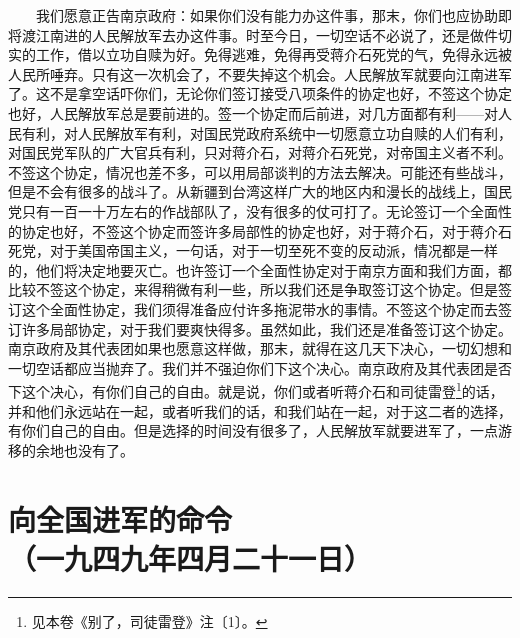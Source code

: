 \documentclass[cn,11pt,chinese]{elegantbook}
\def\myformat#1{\hfil\hfil #1}
\begin{document}
　　我们愿意正告南京政府：如果你们没有能力办这件事，那末，你们也应协助即将渡江南进的人民解放军去办这件事。时至今日，一切空话不必说了，还是做件切实的工作，借以立功自赎为好。免得逃难，免得再受蒋介石死党的气，免得永远被人民所唾弃。只有这一次机会了，不要失掉这个机会。人民解放军就要向江南进军了。这不是拿空话吓你们，无论你们签订接受八项条件的协定也好，不签这个协定也好，人民解放军总是要前进的。签一个协定而后前进，对几方面都有利——对人民有利，对人民解放军有利，对国民党政府系统中一切愿意立功自赎的人们有利，对国民党军队的广大官兵有利，只对蒋介石，对蒋介石死党，对帝国主义者不利。不签这个协定，情况也差不多，可以用局部谈判的方法去解决。可能还有些战斗，但是不会有很多的战斗了。从新疆到台湾这样广大的地区内和漫长的战线上，国民党只有一百一十万左右的作战部队了，没有很多的仗可打了。无论签订一个全面性的协定也好，不签这个协定而签许多局部性的协定也好，对于蒋介石，对于蒋介石死党，对于美国帝国主义，一句话，对于一切至死不变的反动派，情况都是一样的，他们将决定地要灭亡。也许签订一个全面性协定对于南京方面和我们方面，都比较不签这个协定，来得稍微有利一些，所以我们还是争取签订这个协定。但是签订这个全面性协定，我们须得准备应付许多拖泥带水的事情。不签这个协定而去签订许多局部协定，对于我们要爽快得多。虽然如此，我们还是准备签订这个协定。南京政府及其代表团如果也愿意这样做，那末，就得在这几天下决心，一切幻想和一切空话都应当抛弃了。我们并不强迫你们下这个决心。南京政府及其代表团是否下这个决心，有你们自己的自由。就是说，你们或者听蒋介石和司徒雷登\footnote[5]{ 见本卷《别了，司徒雷登》注〔1〕。}的话，并和他们永远站在一起，或者听我们的话，和我们站在一起，对于这二者的选择，有你们自己的自由。但是选择的时间没有很多了，人民解放军就要进军了，一点游移的余地也没有了。\\
\newpage\section*{\myformat{向全国进军的命令}\\\myformat{（一九四九年四月二十一日）}}
\end{document}
